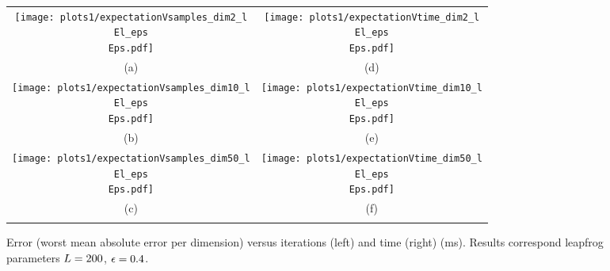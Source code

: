 \begin{figure*}%
\begin{center}
\begin{tabular}{cc}
   \hspace{-5mm} \texttt{[image: plots1/expectationVsamples\_dim2\_l\\El\_eps\\Eps.pdf]} 
& \hspace{-3mm} \texttt{[image: plots1/expectationVtime\_dim2\_l\\El\_eps\\Eps.pdf]} 
\vspace{-1.5mm}
\\
   \hspace{-5mm} \footnotesize(a) 
& \hspace{-4mm} \footnotesize(d) 
\\
\hspace{-5mm} \texttt{[image: plots1/expectationVsamples\_dim10\_l\\El\_eps\\Eps.pdf]} 
& \hspace{-3mm} \texttt{[image: plots1/expectationVtime\_dim10\_l\\El\_eps\\Eps.pdf]} 
\vspace{-1.5mm}
\\
   \hspace{-5mm} \footnotesize(b) 
& \hspace{-4mm} \footnotesize(e) 
\\
\hspace{-5mm} \texttt{[image: plots1/expectationVsamples\_dim50\_l\\El\_eps\\Eps.pdf]} 
& \hspace{-3mm} \texttt{[image: plots1/expectationVtime\_dim50\_l\\El\_eps\\Eps.pdf]} 
\vspace{-1.5mm}
\\
\hspace{-5mm} \footnotesize(c) 
& \hspace{-4mm} \footnotesize(f) 
\\
\multicolumn{2}{c}{}
\end{tabular}
\end{center}
\vspace{-8mm}
\caption{\footnotesize
Error (worst mean absolute error per dimension) versus iterations (left) and time (right) (ms). 
Results correspond leapfrog parameters $L =200$, $\epsilon = 0.4$.
} 
\end{figure*}
